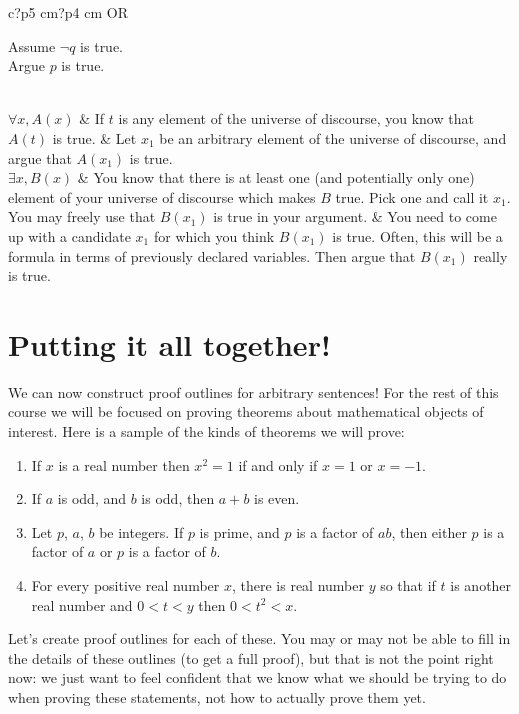 \documentclass{article}
\begin{document}
\begin{table}[h]
\begin{tabular}{c?p{5 cm}?p{4 cm}}
		OR 
		
		\begin{fitch*}
			\textrm{Assume $\neg q$ is true.}\\
			\fa \textrm{Argue $p$ is true. }
		\end{fitch*}
		
		\\ \hline
		$\forall x, A(x)$ & If $t$ is any element of the universe of discourse, you know that $A(t)$ is true. &  Let $x_1$ be an arbitrary element of the universe of discourse, and argue that $A(x_1)$ is true. \\ \hline
		$\exists x, B(x)$ & You know that there is at least one (and potentially only one) element of your universe of discourse which makes $B$ true.  Pick one and call it $x_1$.  You may freely use that $B(x_1)$ is true in your argument. &  You need to come up with a candidate $x_1$ for which you think $B(x_1)$ is true.  Often, this will be a formula in terms of previously declared variables.  Then argue that $B(x_1)$ really is true.
	\end{tabular}
\end{table}

\newpage


\section{Putting it all together!}

We can now construct proof outlines for arbitrary sentences!  For the rest of this course we will be focused on proving theorems about mathematical objects of interest.  Here is a sample of the kinds of theorems we will prove:

\begin{enumerate}
		\item 	If $x$ is a real number then $x^2 = 1$ if and only if $x=1$ or $x=-1$.
		\item If $a$ is odd, and $b$ is odd, then $a+b$ is even.
		\item Let $p$, $a$, $b$ be integers.  If $p$ is prime, and $p$ is a factor of $ab$, then either $p$ is a factor of $a$ or $p$ is a factor of $b$.
		\item For every positive real number $x$, there is real number $y$ so that if $t$ is another real number and $0<t<y$ then $0<t^2<x$.
\end{enumerate}


Let's create proof outlines for each of these.  You may or may not be able to fill in the details of these outlines (to get a full proof), but that is not the point right now:  we just want to feel confident that we know what we should be trying to do when proving these statements, not how to actually prove them yet.
\end{document}
